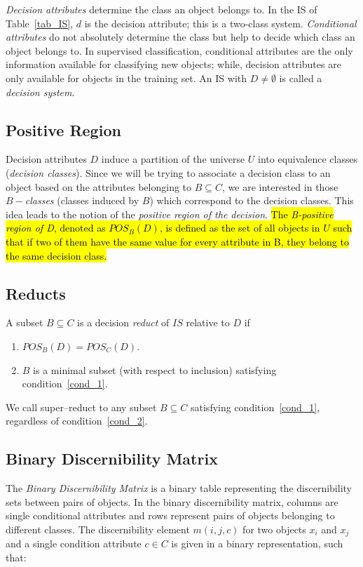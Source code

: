 \documentclass[number,preprint,review,12pt]{elsarticle}
\begin{document}
  \textit{Decision attributes} determine the class an object belongs to. In the IS of Table~\ref{tab_IS}, $d$ is the decision attribute; this is a two-class system. \textit{Conditional attributes} do not absolutely determine the class but help to decide which class an object belongs to. In supervised classification, conditional attributes are the only information available for classifying new objects; while, decision attributes are only available for objects in the training set. An IS with $D \neq \emptyset$ is called a \textit{decision system}.
  
\subsection{Positive Region}\label{subsect_Pos}
  Decision attributes $D$ induce a partition of the universe $U$ into equivalence classes (\textit{decision classes}). Since we will be trying to associate a decision class to an object based on the attributes belonging to $B \subseteq C$, we are interested in those $B-$\textit{classes} (classes induced by $B$) which correspond to the decision classes. This idea leads to the notion of the  \textit{positive region of the decision}. \hl{The \textit{B-positive region of D}, denoted as $POS_B(D)$, is defined as the set of all objects in $U$ such that if two of them have the same value for every attribute in B, they belong to the same decision class.}
 
\subsection{Reducts}\label{def_reduct}
  A subset $B \subseteq C$ is a decision \textit{reduct} of $IS$ relative to $D$ if
  \begin{enumerate}
  	\item $POS_B(D)=POS_C(D)$. \label{cond_1}
  	\item $B$ is a minimal subset (with respect to inclusion) satisfying condition~\ref{cond_1}.\label{cond_2}
  \end{enumerate}

  We call super--reduct to any subset $B \subseteq C$ satisfying condition~\ref{cond_1}, regardless of condition~\ref{cond_2}.
  
%  
\subsection{Binary Discernibility Matrix}
  The \textit{Binary Discernibility Matrix} is a binary table representing the discernibility sets between pairs 
  of objects. In the binary discernibility matrix, columns are single conditional attributes and rows represent pairs of objects belonging to different classes. The discernibility element $m(i, j, c)$ for two objects $x_i$ and $x_j$ and a single condition attribute $c \in C$ is given in a binary representation, such that:
  
\end{document}
